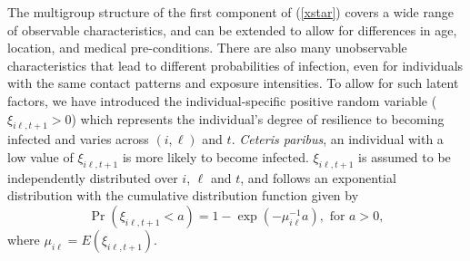 \documentclass[12pt]{article}
\begin{document}
The multigroup structure of the first component of (\ref{xstar}) covers a wide
range of observable characteristics, and can be extended to allow for
differences in age, location, and medical pre-conditions. There are also many
unobservable characteristics that lead to different probabilities of
infection, even for individuals with the same contact patterns and exposure
intensities. To allow for such latent factors, we have introduced the
individual-specific positive random variable ($\xi_{i\ell,t+1}>0$) which
represents the individual's degree of resilience to becoming infected and
varies across $(i,\ell)$ and $t.$ \textit{Ceteris paribus}, an individual with
a low value of $\xi_{i\ell,t+1}$ is more likely to become infected.
$\xi_{i\ell,t+1}$ is assumed to be independently distributed over $i$, $\ell$
and $t$, and follows an exponential distribution with the cumulative
distribution function given by
\begin{equation}
\Pr\left(  \xi_{i\ell,t+1}<a\right)  =1-\exp\left(  -\mu_{i\ell}^{-1}a\right)
,\text{ \ for }a>0,\label{xi}%
\end{equation}
where $\mu_{i\ell}=E\left(  \xi_{i\ell,t+1}\right)  $.
\end{document}
